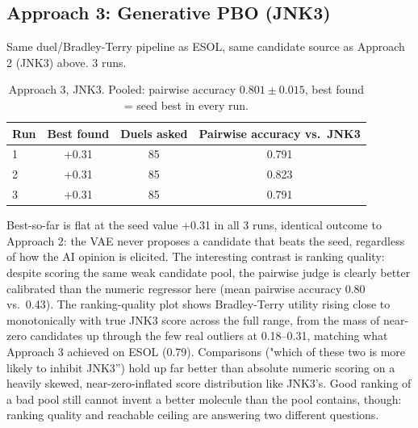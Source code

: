 \documentclass[11pt,a4paper]{article}
\begin{document}
\subsection{Approach 3: Generative PBO (JNK3)}
Same duel/Bradley-Terry pipeline as ESOL, same candidate source as Approach 2 (JNK3) above. 3 runs.

\begin{table}[h]
\centering
\begin{tabular}{lccc}
\hline
Run & Best found & Duels asked & Pairwise accuracy vs.\ JNK3 \\
\hline
1 & +0.31 & 85 & 0.791 \\
2 & +0.31 & 85 & 0.823 \\
3 & +0.31 & 85 & 0.791 \\
\hline
\end{tabular}
\caption{Approach 3, JNK3. Pooled: pairwise accuracy $0.801 \pm 0.015$, best found = seed best in every run.}
\label{tab:results_a3_jnk3}
\end{table}

Best-so-far is flat at the seed value +0.31 in all 3 runs, identical outcome to Approach 2: the VAE never proposes a candidate that beats the seed, regardless of how the AI opinion is elicited. The interesting contrast is ranking quality: despite scoring the same weak candidate pool, the pairwise judge is clearly better calibrated than the numeric regressor here (mean pairwise accuracy 0.80 vs.\ 0.43). The ranking-quality plot shows Bradley-Terry utility rising close to monotonically with true JNK3 score across the full range, from the mass of near-zero candidates up through the few real outliers at 0.18--0.31, matching what Approach 3 achieved on ESOL (0.79). Comparisons ("which of these two is more likely to inhibit JNK3'') hold up far better than absolute numeric scoring on a heavily skewed, near-zero-inflated score distribution like JNK3's. Good ranking of a bad pool still cannot invent a better molecule than the pool contains, though: ranking quality and reachable ceiling are answering two different questions.
\end{document}
